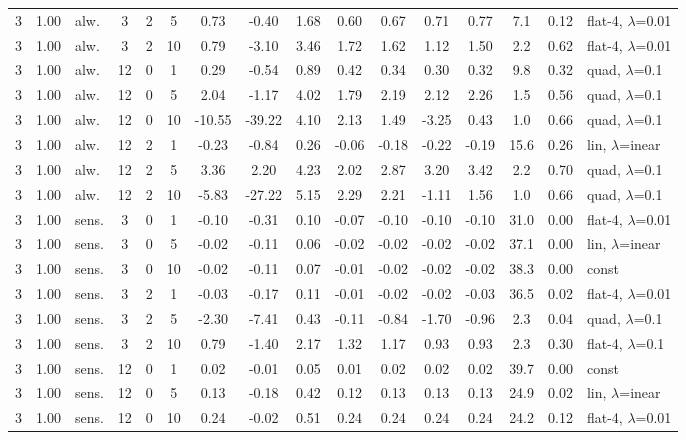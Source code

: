 \documentclass[10pt]{article}
\begin{document}
\begin{scriptsize}
\begin{longtable}{cclcc c ccc ccc c cc l}
3 & 1.00 & alw. & 3 & 2 & 5 & 0.73 & -0.40 & 1.68 & 0.60 & 0.67 & 0.71 & 0.77 & 7.1 & 0.12 & flat-4, $\lambda$=0.01 \\
3 & 1.00 & alw. & 3 & 2 & 10 & 0.79 & -3.10 & 3.46 & 1.72 & 1.62 & 1.12 & 1.50 & 2.2 & 0.62 & flat-4, $\lambda$=0.01 \\
3 & 1.00 & alw. & 12 & 0 & 1 & 0.29 & -0.54 & 0.89 & 0.42 & 0.34 & 0.30 & 0.32 & 9.8 & 0.32 & quad, $\lambda$=0.1 \\
3 & 1.00 & alw. & 12 & 0 & 5 & 2.04 & -1.17 & 4.02 & 1.79 & 2.19 & 2.12 & 2.26 & 1.5 & 0.56 & quad, $\lambda$=0.1 \\
3 & 1.00 & alw. & 12 & 0 & 10 & -10.55 & -39.22 & 4.10 & 2.13 & 1.49 & -3.25 & 0.43 & 1.0 & 0.66 & quad, $\lambda$=0.1 \\
3 & 1.00 & alw. & 12 & 2 & 1 & -0.23 & -0.84 & 0.26 & -0.06 & -0.18 & -0.22 & -0.19 & 15.6 & 0.26 & lin, $\lambda$=inear \\
3 & 1.00 & alw. & 12 & 2 & 5 & 3.36 & 2.20 & 4.23 & 2.02 & 2.87 & 3.20 & 3.42 & 2.2 & 0.70 & quad, $\lambda$=0.1 \\
3 & 1.00 & alw. & 12 & 2 & 10 & -5.83 & -27.22 & 5.15 & 2.29 & 2.21 & -1.11 & 1.56 & 1.0 & 0.66 & quad, $\lambda$=0.1 \\
3 & 1.00 & sens. & 3 & 0 & 1 & -0.10 & -0.31 & 0.10 & -0.07 & -0.10 & -0.10 & -0.10 & 31.0 & 0.00 & flat-4, $\lambda$=0.01 \\
3 & 1.00 & sens. & 3 & 0 & 5 & -0.02 & -0.11 & 0.06 & -0.02 & -0.02 & -0.02 & -0.02 & 37.1 & 0.00 & lin, $\lambda$=inear \\
3 & 1.00 & sens. & 3 & 0 & 10 & -0.02 & -0.11 & 0.07 & -0.01 & -0.02 & -0.02 & -0.02 & 38.3 & 0.00 & const \\
3 & 1.00 & sens. & 3 & 2 & 1 & -0.03 & -0.17 & 0.11 & -0.01 & -0.02 & -0.02 & -0.03 & 36.5 & 0.02 & flat-4, $\lambda$=0.01 \\
3 & 1.00 & sens. & 3 & 2 & 5 & -2.30 & -7.41 & 0.43 & -0.11 & -0.84 & -1.70 & -0.96 & 2.3 & 0.04 & quad, $\lambda$=0.1 \\
3 & 1.00 & sens. & 3 & 2 & 10 & 0.79 & -1.40 & 2.17 & 1.32 & 1.17 & 0.93 & 0.93 & 2.3 & 0.30 & flat-4, $\lambda$=0.1 \\
3 & 1.00 & sens. & 12 & 0 & 1 & 0.02 & -0.01 & 0.05 & 0.01 & 0.02 & 0.02 & 0.02 & 39.7 & 0.00 & const \\
3 & 1.00 & sens. & 12 & 0 & 5 & 0.13 & -0.18 & 0.42 & 0.12 & 0.13 & 0.13 & 0.13 & 24.9 & 0.02 & lin, $\lambda$=inear \\
3 & 1.00 & sens. & 12 & 0 & 10 & 0.24 & -0.02 & 0.51 & 0.24 & 0.24 & 0.24 & 0.24 & 24.2 & 0.12 & flat-4, $\lambda$=0.01 \\

\end{longtable}
\end{scriptsize}
\end{document}
